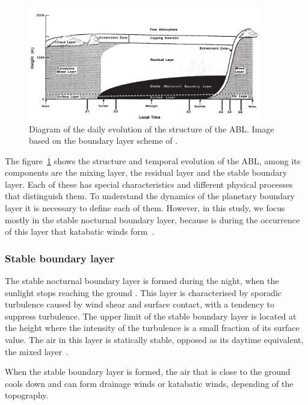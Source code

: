 \documentclass[a4paper,12pt]{article}
\begin{document}
\begin{figure}[ht!]
	\vspace{-5pt}
    \centering
\includegraphics[width=0.9\textwidth]{fig/abl_stull.png}
    \caption{Diagram of the daily evolution of the structure of the ABL. Image based on the boundary layer scheme of \cite{stull2012introduction}.}
    \label{fig:ABL_structure}
  \vspace{-5pt}
\end{figure}

The figure~\ref{fig:ABL_structure} shows the structure and temporal evolution of the ABL, among its components are the mixing layer, the residual layer and the stable boundary layer. Each of these has special characteristics and different physical processes that distinguish them. To understand the dynamics of the planetary boundary layer it is necessary to define each of them. However, in this study, we focus mostly in the stable nocturnal boundary layer, because is during the occurrence of this layer that katabatic winds form~\citep{poulos2008observational, stull2012introduction}.

\subsubsection{Stable boundary layer}
The stable nocturnal boundary layer is formed during the night, when the sunlight stops reaching the ground . This layer is characterised by sporadic turbulence caused by wind shear and surface contact, with a tendency to suppress turbulence. The upper limit of the stable boundary layer is located at the height where the intensity of the turbulence is a small fraction of its surface value. The air in this layer is statically stable, opposed as its daytime equivalent, the mixed layer~\citep{stull2012introduction}.

When the stable boundary layer is formed, the air that is close to the ground cools down and can form drainage winds or katabatic winds, depending of the topography.
\end{document}
